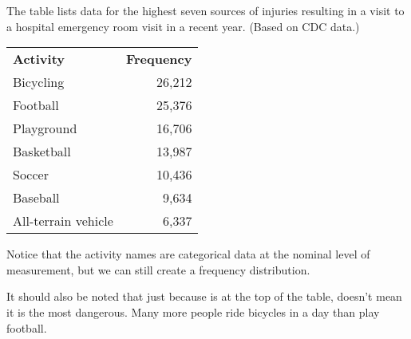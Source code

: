 \documentclass{beamer}
\begin{document}
\begin{frame}
\begin{example}
The table lists data for the highest seven sources of injuries resulting in a visit to a hospital emergency room visit in a recent year. (Based on CDC data.)
\begin{center}
\begin{tabular}{lr}
\textbf{Activity} & \textbf{Frequency} \\
Bicycling & 26,212 \\
Football & 25,376 \\
Playground & 16,706 \\
Basketball & 13,987 \\
Soccer & 10,436 \\
Baseball & 9,634 \\
All-terrain vehicle & 6,337
\end{tabular}
\end{center}\pause

Notice that the activity names are categorical data at the nominal level of measurement, but we can still create a frequency distribution.\pause

It should also be noted that just because  is at the top of the table, doesn't mean it is the most dangerous. Many more people ride bicycles in a day than play football.
\end{example}
\end{frame}
\end{document}
